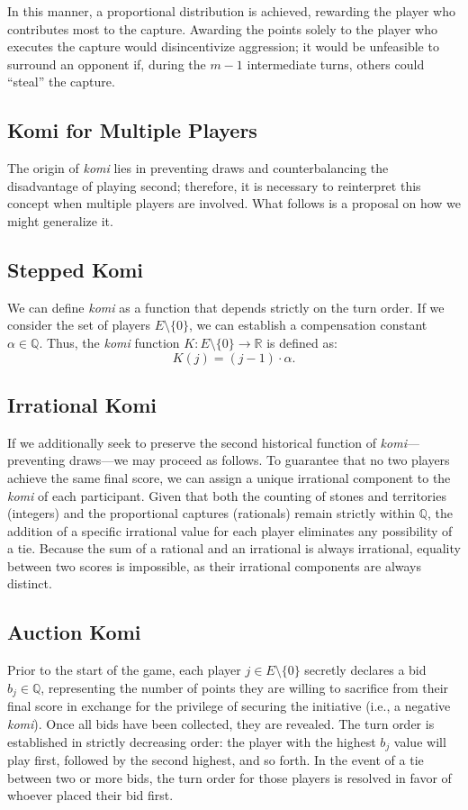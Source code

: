 In this manner, a proportional distribution is achieved, rewarding the player who contributes most to the capture. Awarding the points solely to the player who executes the capture would disincentivize aggression; it would be unfeasible to surround an opponent if, during the \(m-1\) intermediate turns, others could ``steal'' the capture.

\subsection{Komi for Multiple Players}\label{komi_n_jug}

The origin of \textit{komi} lies in preventing draws and counterbalancing the disadvantage of playing second; therefore, it is necessary to reinterpret this concept when multiple players are involved. What follows is a proposal on how we might generalize it.

\subsection*{Stepped Komi}
We can define \textit{komi} as a function that depends strictly on the turn order. If we consider the set of players \(E \setminus \{0\}\), we can establish a compensation constant \(\alpha \in \mathbb{Q}\). Thus, the \textit{komi} function \(K: E \setminus \{0\} \to \mathbb{R}\) is defined as:
$$K(j) = (j - 1) \cdot \alpha.$$

\subsection*{Irrational Komi}
If we additionally seek to preserve the second historical function of \textit{komi}—preventing draws—we may proceed as follows. To guarantee that no two players achieve the same final score, we can assign a unique irrational component to the \textit{komi} of each participant. Given that both the counting of stones and territories (integers) and the proportional captures (rationals) remain strictly within $\mathbb{Q}$, the addition of a specific irrational value for each player eliminates any possibility of a tie. Because the sum of a rational and an irrational is always irrational, equality between two scores is impossible, as their irrational components are always distinct.

\subsection*{Auction Komi}
Prior to the start of the game, each player $j \in E \setminus \{0\}$ secretly declares a bid $b_j \in \mathbb{Q}$, representing the number of points they are willing to sacrifice from their final score in exchange for the privilege of securing the initiative (i.e., a negative \textit{komi}). Once all bids have been collected, they are revealed. The turn order is established in strictly decreasing order: the player with the highest $b_j$ value will play first, followed by the second highest, and so forth. In the event of a tie between two or more bids, the turn order for those players is resolved in favor of whoever placed their bid first.

